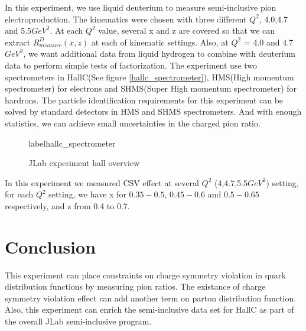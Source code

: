 \documentclass[12pt]{article}
\begin{document}
In this experiment, we use liquid deuterium to measure semi-inclusive pion electroproduction. The kinematics were chosen with three different $Q^2$, 4.0,4.7 and 5.5$GeV^2$. At each $Q^2$ value, several x and z are covered so that we can extract $R^D_{measure}(x,z)$ at each of kinematic settings. Also, at $Q^2$ = 4.0 and 4.7 $GeV^2$, we want additional data from liquid hydrogen to combine with deuterium data to perform simple tests of factorization. The experiment use two spectrometers in HallC(See figure \ref{hallc_spectrometer}), HMS(High momentum spectrometer) for electrons and SHMS(Super High momentum spectrometer) for hardrons. The particle identification requirements for this experiment can be solved by standard detectors in HMS and SHMS spectrometers. And with enough statistics, we can achieve small uncertainties in the charged pion ratio.
\begin{figure}%
    \centering
    \qquad
    \caption{JLab experiment hall overview}%
    label{hallc_spectrometer}
  \end{figure}    
In this experiment we measured CSV effect at several $Q^2$ (4,4.7,5.5$GeV^2$) setting, for each $Q^2$ setting, we have x for $0.35-0.5$, $0.45-0.6$ and $0.5-0.65$ respectively, and z from 0.4 to 0.7.
\section{Conclusion}
This experiment can place constraints on charge symmetry violation in quark distribution functions by measuring pion ratios. The existance of charge symmetry violation effect can add another term on parton distribution function.  Also, this experiment can enrich the semi-inclusive data set for HallC  as part of the overall JLab semi-inclusive program. 

\medskip



\end{document}
